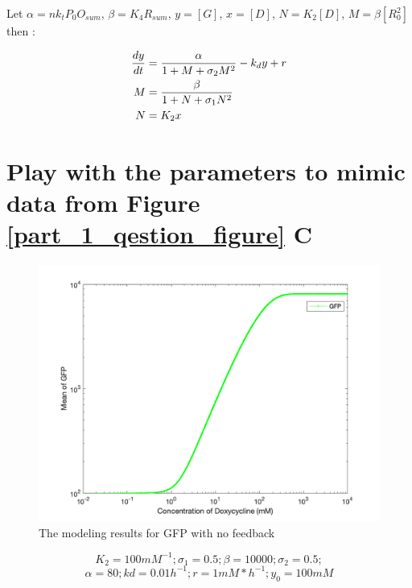 \newpage
Let $\alpha=nk_tP_0O_{sum}$, $\beta=K_4R_{sum}$, $y=[G]$, $x=[D]$, $N=K_2[D]$, 
$M=\beta[R^2_0]$ \\ then :

\begin{equation} 
\begin{aligned} 
\centering
\frac{dy}{dt} &= 
\frac{\alpha}{1+M+\sigma_{2}M^2} - k_dy + r\\
M &= 
\frac{\beta}{1+N+\sigma_{1}N^2}\\
N &= 
K_2x \\
\end{aligned} 
\end{equation}

\section{Play with the parameters to mimic data from Figure \ref{part_1_qestion_figure} C}

\begin{figure}[H]
\centering
\includegraphics[width=1.0\linewidth]{Figures/Q1_1.png}
\caption{The modeling results for GFP with no feedback}
\label{part_1_model}
\end{figure}

$$K_2 = 100 mM^{-1}; \sigma_1 = 0.5; \beta = 10000 ; \sigma_2 = 0.5;$$ 
$$\alpha = 80 ; kd = 0.01h^{-1} ; r = 1mM*h^{-1} ;y_0 = 100mM$$





